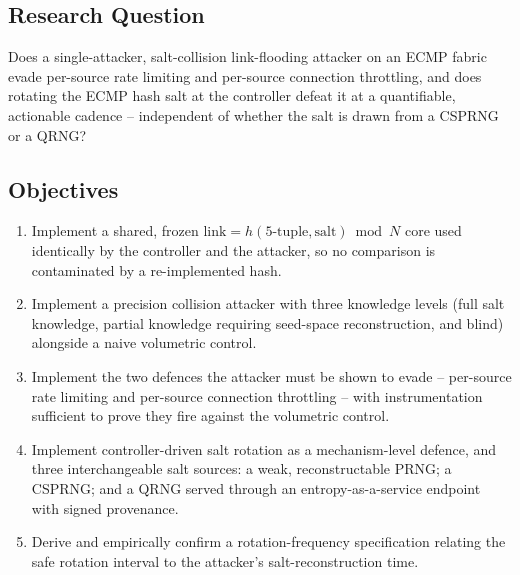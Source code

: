 \documentclass[conference]{IEEEtran}
\begin{document}
\subsection*{Research Question}
Does a single-attacker, salt-collision link-flooding attacker on an ECMP fabric evade per-source rate limiting
and per-source connection throttling, and does rotating the ECMP hash salt at the controller defeat it at a
quantifiable, actionable cadence -- independent of whether the salt is drawn from a CSPRNG or a QRNG?

\subsection*{Objectives}
\begin{enumerate}
\item Implement a shared, frozen $\mathrm{link} = h(\mathrm{5\text{-}tuple}, \mathrm{salt}) \bmod N$ core used
identically by the controller and the attacker, so no comparison is contaminated by a re-implemented hash.
\item Implement a precision collision attacker with three knowledge levels (full salt knowledge, partial
knowledge requiring seed-space reconstruction, and blind) alongside a naive volumetric control.
\item Implement the two defences the attacker must be shown to evade -- per-source rate limiting and per-source
connection throttling -- with instrumentation sufficient to prove they fire against the volumetric control.
\item Implement controller-driven salt rotation as a mechanism-level defence, and three interchangeable salt
sources: a weak, reconstructable PRNG; a CSPRNG; and a QRNG served through an entropy-as-a-service endpoint with
signed provenance.
\item Derive and empirically confirm a rotation-frequency specification relating the safe rotation interval to
the attacker's salt-reconstruction time.
\end{enumerate}
\end{document}
